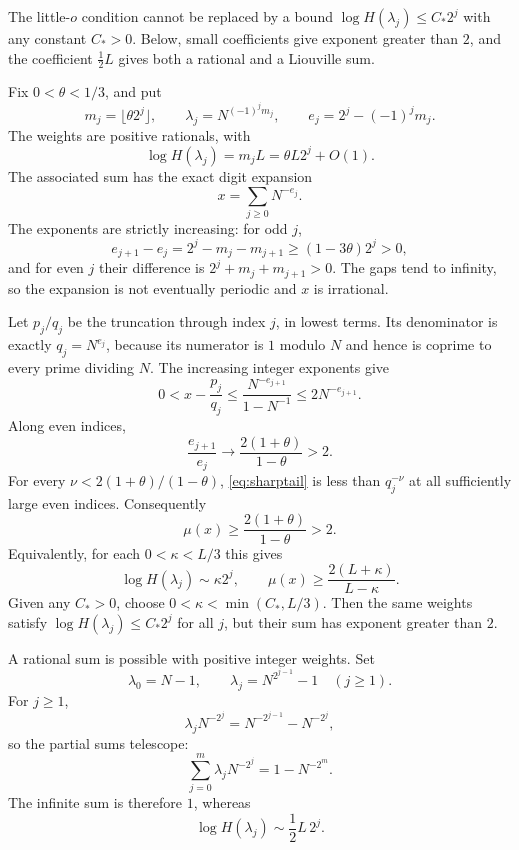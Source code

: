 \documentclass{amsart}
\numberwithin{equation}{section}
\begin{document}
The little-$o$ condition cannot be replaced by a bound
$\log H(\lambda_j)\le C_*2^j$ with any constant $C_*>0$. Below,
small coefficients give exponent greater than $2$, and the coefficient
$\tfrac12L$ gives both a rational and a Liouville sum.

Fix $0<\theta<1/3$, and put
\begin{equation}\label{eq:sharpweights}
m_j=\lfloor\theta2^j\rfloor,\qquad
\lambda_j=N^{(-1)^jm_j},\qquad
e_j=2^j-(-1)^jm_j.
\end{equation}
The weights are positive rationals, with
\begin{equation}\label{eq:sharpheight}
\log H(\lambda_j)=m_jL=\theta L2^j+O(1).
\end{equation}
The associated sum has the exact digit expansion
\[
x=\sum_{j\ge0}N^{-e_j}.
\]
The exponents are strictly increasing: for odd $j$,
\[
e_{j+1}-e_j=2^j-m_j-m_{j+1}\ge(1-3\theta)2^j>0,
\]
and for even $j$ their difference is $2^j+m_j+m_{j+1}>0$.
The gaps tend to infinity, so the expansion is not eventually periodic
and $x$ is irrational.

Let $p_j/q_j$ be the truncation through index $j$, in lowest terms.
Its denominator is exactly $q_j=N^{e_j}$, because its numerator is
$1$ modulo $N$ and hence is coprime to every prime dividing $N$.
The increasing integer exponents give
\begin{equation}\label{eq:sharptail}
0<x-\frac{p_j}{q_j}
 \le\frac{N^{-e_{j+1}}}{1-N^{-1}}\le2N^{-e_{j+1}}.
\end{equation}
Along even indices,
\[
\frac{e_{j+1}}{e_j}\longrightarrow\frac{2(1+\theta)}{1-\theta}>2.
\]
For every $\nu<2(1+\theta)/(1-\theta)$, \eqref{eq:sharptail} is less than
$q_j^{-\nu}$ at all sufficiently large even indices. Consequently
\begin{equation}\label{eq:sharpmu}
\mu(x)\ge\frac{2(1+\theta)}{1-\theta}>2.
\end{equation}
Equivalently, for each $0<\kappa<L/3$ this gives
\[
\log H(\lambda_j)\sim \kappa2^j,\qquad
\mu(x)\ge\frac{2(L+\kappa)}{L-\kappa}.
\]
Given any $C_*>0$, choose $0<\kappa<\min(C_*,L/3)$.
Then the same weights satisfy $\log H(\lambda_j)\le C_*2^j$ for
all $j$, but their sum has exponent greater than $2$.

A rational sum is possible with positive integer weights. Set
\begin{equation}\label{eq:rationalsharp}
\lambda_0=N-1,\qquad
\lambda_j=N^{2^{j-1}}-1\quad(j\ge1).
\end{equation}
For $j\ge1$,
\[
\lambda_jN^{-2^j}=N^{-2^{j-1}}-N^{-2^j},
\]
so the partial sums telescope:
\[
\sum_{j=0}^{m}\lambda_jN^{-2^j}=1-N^{-2^m}.
\]
The infinite sum is therefore $1$, whereas
\begin{equation}\label{eq:halfheight}
\log H(\lambda_j)\sim\frac12L\,2^j.
\end{equation}
\end{document}
